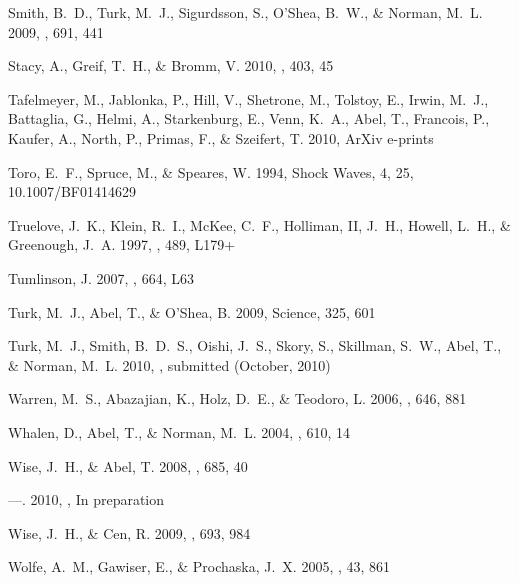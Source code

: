\documentclass[apjl]{emulateapj}
\begin{document}
\begin{thebibliography}{50}
{Smith}, B.~D., {Turk}, M.~J., {Sigurdsson}, S., {O'Shea}, B.~W., \& {Norman},
  M.~L. 2009, \apj, 691, 441

{Stacy}, A., {Greif}, T.~H., \& {Bromm}, V. 2010, \mnras, 403, 45

{Tafelmeyer}, M., {Jablonka}, P., {Hill}, V., {Shetrone}, M., {Tolstoy}, E.,
  {Irwin}, M.~J., {Battaglia}, G., {Helmi}, A., {Starkenburg}, E., {Venn},
  K.~A., {Abel}, T., {Francois}, P., {Kaufer}, A., {North}, P., {Primas}, F.,
  \& {Szeifert}, T. 2010, ArXiv e-prints

Toro, E.~F., Spruce, M., \& Speares, W. 1994, Shock Waves, 4, 25,
  10.1007/BF01414629

{Truelove}, J.~K., {Klein}, R.~I., {McKee}, C.~F., {Holliman}, II, J.~H.,
  {Howell}, L.~H., \& {Greenough}, J.~A. 1997, \apjl, 489, L179+

{Tumlinson}, J. 2007, \apjl, 664, L63

{Turk}, M.~J., {Abel}, T., \& {O'Shea}, B. 2009, Science, 325, 601

{Turk}, M.~J., {Smith}, B.~D.~S., {Oishi}, J.~S., {Skory}, S., {Skillman},
  S.~W., {Abel}, T., \& {Norman}, M.~L. 2010, \apjs, submitted (October, 2010)

{Warren}, M.~S., {Abazajian}, K., {Holz}, D.~E., \& {Teodoro}, L. 2006, \apj,
  646, 881

{Whalen}, D., {Abel}, T., \& {Norman}, M.~L. 2004, \apj, 610, 14

{Wise}, J.~H., \& {Abel}, T. 2008, \apj, 685, 40

---. 2010, \apjs, In preparation

{Wise}, J.~H., \& {Cen}, R. 2009, \apj, 693, 984

{Wolfe}, A.~M., {Gawiser}, E., \& {Prochaska}, J.~X. 2005, \araa, 43, 861

\end{thebibliography}
\end{document}
